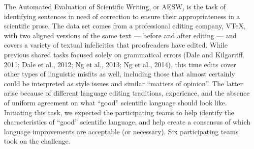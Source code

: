 The Automated Evaluation of Scientific Writing, or AESW, is the task of identifying sentences in need of correction to ensure their appropriateness in a scientific prose. The data set comes from a professional editing company, VTeX, with two aligned versions of the same text --- before and after editing --- and covers a variety of textual infelicities that proofreaders have edited. While previous shared tasks focused solely on grammatical errors (Dale and Kilgarriff, 2011; Dale et al., 2012; Ng et al., 2013; Ng et al., 2014), this time edits cover other types of linguistic misfits as well, including those that almost certainly could be interpreted as style issues and similar ``matters of opinion''. The latter arise because of different language editing traditions, experience, and the absence of uniform agreement on what ``good'' scientific language should look like. Initiating this task, we expected the participating teams to help identify the characteristics of ``good'' scientific language, and help create a consensus of which language improvements are acceptable (or necessary). Six participating teams took on the challenge.
